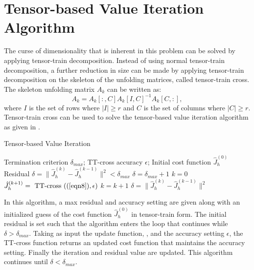 \section{Tensor-based Value Iteration Algorithm}

The curse of dimensionality that is inherent in this problem can be solved by applying tensor-train decomposition. Instead of using normal tensor-train decomposition, a further reduction in size can be made by applying tensor-train decomposition on the skeleton of the unfolding matrices, called tensor-train cross. The skeleton unfolding matrix $A_k$ can be written as:
\begin{equation}
A_k = A_k[:,C]A_k[I,C]^{-1}A_k[C,:],
\end{equation}
where $I$ is the set of rows where $|I| \geq r$ and $C$ is the set of columns where $|C| \geq r$. Tensor-train cross can be used to solve the tensor-based value iteration algorithm as given in .
\begin{algorithm}
\caption{Tensor-based Value Iteration \cite{Gorod}}\label{TVIalg}
\begin{algorithmic}[1]
	\Require Termination criterion $\delta_{max}$; TT-cross accuracy $\epsilon$; Initial cost function $\hat{J}_h^{(0)}$
	\Ensure Residual $\delta=\|\hat{J}_h^{(k)}-\hat{J}_h^{(k-1)}\|^2<\delta_{max}$
	\State $\delta = \delta_{max} + 1$
	\State $k = 0$
	 \do{}
		\State $\hat{J}_h^{(k+1)} = \textnormal{ TT-cross }((\ref{eqn8}),\epsilon)$
		\State $k = k+1$
		\State $\delta = \|\hat{J}_h^{(k)}-\hat{J}_h^{(k-1)}\|^2$
	\EndWhile
\end{algorithmic}
\end{algorithm}

In this algorithm, a max residual and accuracy setting are given along with an initialized guess of the cost function $\hat{J}_h^{(0)}$ in tensor-train form. The initial residual is set such that the algorithm enters the loop that continues while $\delta > \delta_{max}$. Taking as input the update function, , and the accuracy setting $\epsilon$, the TT-cross function returns an updated cost function that maintains the accuracy setting. Finally the iteration and residual value are updated. This algorithm continues until $\delta < \delta_{max}$. 

